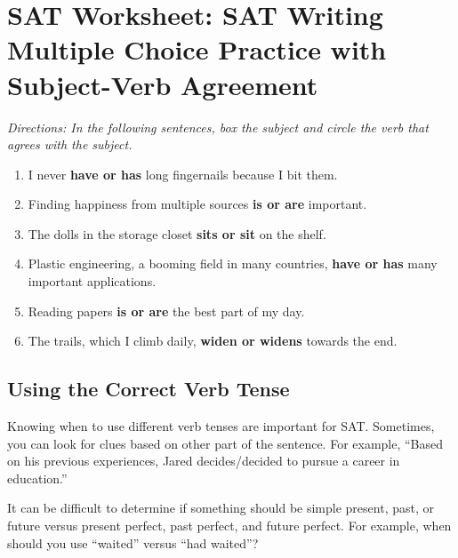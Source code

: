\section{SAT Worksheet: SAT Writing Multiple Choice Practice with Subject-Verb Agreement}

\textit{Directions: In the following sentences, box the subject and circle the verb that agrees with the subject.}

\begin{enumerate}
\item{I never \textbf{ have or has} long fingernails because I bit them.}


\item{Finding happiness from multiple sources \textbf{is or are} important.}


\item{The dolls in the storage closet \textbf{sits or sit} on the shelf.}


\item{Plastic engineering, a booming field in many countries, \textbf{have or has} many important applications.}


\item{Reading papers \textbf{is or are} the best part of my day.}


\item{The trails, which I climb daily, \textbf{widen or widens} towards the end.}

\end{enumerate}

\subsection{Using the Correct Verb Tense}

Knowing when to use different verb tenses are important for SAT. Sometimes, you can look for
clues based on other part of the sentence. For example, ``Based on his previous experiences, Jared
decides/decided to pursue a career in education.''

\bigskip
It can be difficult to determine if something should be simple present, past, or future versus present
perfect, past perfect, and future perfect. For example, when should you use ``waited'' versus ``had
waited''?

